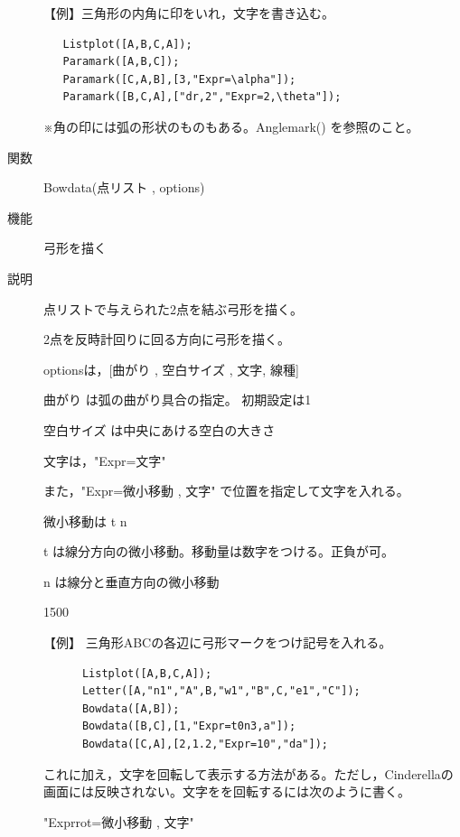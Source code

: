 \documentclass[papersize,a4paper,12pt,uplatex]{jsarticle}
\begin{document}
\begin{description}
\vspace{\baselineskip}
【例】三角形の内角に印をいれ，文字を書き込む。

\begin{verbatim}
   Listplot([A,B,C,A]);
   Paramark([A,B,C]);
   Paramark([C,A,B],[3,"Expr=\alpha"]);
   Paramark([B,C,A],["dr,2","Expr=2,\theta"]);
\end{verbatim}

※角の印には弧の形状のものもある。Anglemark() を参照のこと。\\

\vspace{\baselineskip}
\hypertarget{bowdata}{}
\item[関数]  Bowdata(点リスト , options)
\item[機能]  弓形を描く
\item[説明]  点リストで与えられた2点を結ぶ弓形を描く。

2点を反時計回りに回る方向に弓形を描く。

optionsは，[曲がり , 空白サイズ  , 文字, 線種]

曲がり  は弧の曲がり具合の指定。 初期設定は1

空白サイズ  は中央にあける空白の大きさ

文字は，"Expr=文字" 

また，"Expr=微小移動 , 文字"  で位置を指定して文字を入れる。

微小移動は t  n 

 t は線分方向の微小移動。移動量は数字をつける。正負が可。

 n は線分と垂直方向の微小移動

\vspace{\baselineskip}
 \begin{layer}{150}{0}
 \end{layer}

【例】  三角形ABCの各辺に弓形マークをつけ記号を入れる。
\begin{verbatim}
      Listplot([A,B,C,A]);
      Letter([A,"n1","A",B,"w1","B",C,"e1","C"]);
      Bowdata([A,B]);
      Bowdata([B,C],[1,"Expr=t0n3,a"]);
      Bowdata([C,A],[2,1.2,"Expr=10","da"]);
\end{verbatim}

\vspace{\baselineskip}
これに加え，文字を回転して表示する方法がある。ただし，Cinderellaの画面には反映されない。文字をを回転するには次のように書く。

\hspace{10mm}"Exprrot=微小移動 , 文字"


\end{description}
\end{document}
